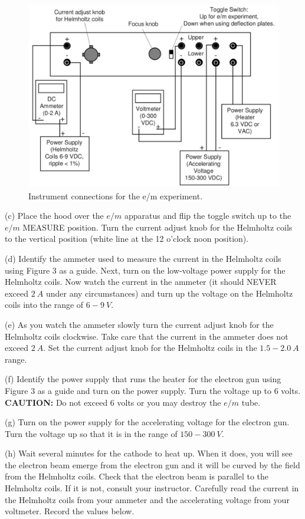 \begin{figure}[hbt]
\begin{center}
\includegraphics[height=3.25in]{eoverm2/apparatus2.pdf}
\caption{Instrument connections for the e/m experiment.}
\end{center}
\end{figure}

(c) Place the hood over the $e/m$ apparatus and flip the 
toggle switch up to the $e/m$ MEASURE
position.
Turn the current adjust knob for the Helmholtz coils to the vertical position (white line
at the 12 o'clock noon position).

(d) Identify the ammeter used to measure the current in the Helmholtz
coils using Figure 3 as a guide. 
Next, turn on the low-voltage power supply for the Helmholtz coils.
Now watch the current in the ammeter (it should NEVER exceed $2~A$ under
any circumstances) and
turn up the voltage on the Helmholtz coils into the range of $6-9~V$.

(e) As you watch the ammeter slowly turn the current adjust knob for the Helmholtz
coils clockwise. Take care that
the current in the ammeter does not exceed $2 ~A$.
Set the current adjust knob for the Helmholtz coils in the $1.5-2.0~A$ range.

(f) Identify the power supply that runs the heater for the electron gun using Figure 3 as a guide
and turn on the power supply. Turn the voltage up to 6 volts.
{\bf CAUTION:} Do not exceed 6 volts or you may destroy the $e/m$
tube.

(g) Turn on the power supply for the accelerating voltage for the electron gun.
Turn the voltage up so that it is in the range of $150-300~V$.

(h) Wait several minutes for the cathode to heat up. When
it does, you will see the electron beam emerge from
the electron gun and it will be curved by the field from
the Helmholtz coils. Check that the electron beam is
parallel to the Helmholtz coils. If it is not, consult your instructor.
 Carefully read the current in the Helmholtz coils from
your ammeter and the accelerating voltage from your
voltmeter. Record the values below.
\vspace{25mm}

